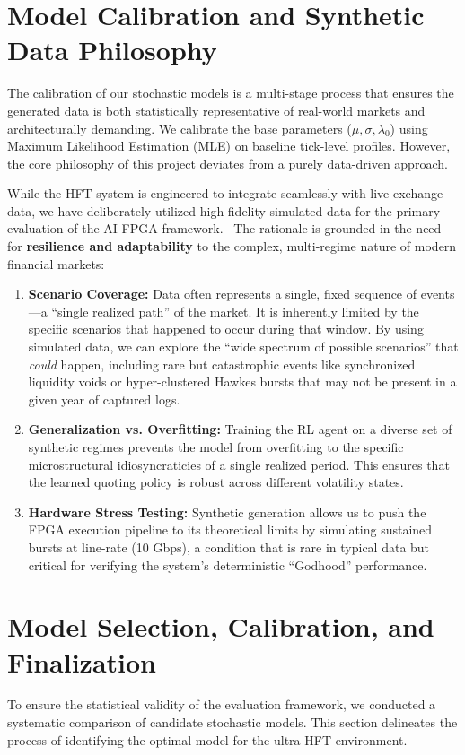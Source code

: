 \section{Model Calibration and Synthetic Data Philosophy}
The calibration of our stochastic models is a multi-stage process that ensures the generated data is both statistically representative of real-world markets and architecturally demanding. We calibrate the base parameters ($\mu, \sigma, \lambda_0$) using Maximum Likelihood Estimation (MLE) on baseline tick-level profiles. However, the core philosophy of this project deviates from a purely data-driven approach.

While the HFT system is engineered to integrate seamlessly with live exchange data, we have deliberately utilized high-fidelity simulated data for the primary evaluation of the AI-FPGA framework. \datamethodology\ The rationale is grounded in the need for \textbf{resilience and adaptability} to the complex, multi-regime nature of modern financial markets:

\begin{enumerate}
    \item \textbf{Scenario Coverage:} Data often represents a single, fixed sequence of events—a ``single realized path'' of the market. It is inherently limited by the specific scenarios that happened to occur during that window. By using simulated data, we can explore the ``wide spectrum of possible scenarios'' that \textit{could} happen, including rare but catastrophic events like synchronized liquidity voids or hyper-clustered Hawkes bursts that may not be present in a given year of captured logs.
    \item \textbf{Generalization vs. Overfitting:} Training the RL agent on a diverse set of synthetic regimes prevents the model from overfitting to the specific microstructural idiosyncraticies of a single realized period. This ensures that the learned quoting policy is robust across different volatility states.
    \item \textbf{Hardware Stress Testing:} Synthetic generation allows us to push the FPGA execution pipeline to its theoretical limits by simulating sustained bursts at line-rate (10 Gbps), a condition that is rare in typical data but critical for verifying the system's deterministic ``Godhood'' performance.
\end{enumerate}

\section{Model Selection, Calibration, and Finalization}
To ensure the statistical validity of the evaluation framework, we conducted a systematic comparison of candidate stochastic models. This section delineates the process of identifying the optimal model for the ultra-HFT environment.

